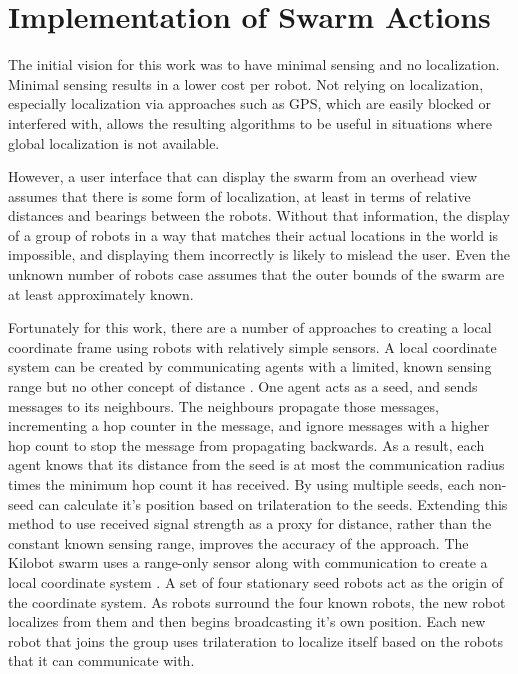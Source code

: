 \section{Implementation of Swarm Actions} \label{section:Implementation_of_Swarm_Actions}

The initial vision for this work was to have minimal sensing and no localization. 
Minimal sensing results in a lower cost per robot. 
Not relying on localization, especially localization via approaches such as GPS, which are easily blocked or interfered with, allows the resulting algorithms to be useful in situations where global localization is not available. 

However, a user interface that can display the swarm from an overhead view assumes that there is some form of localization, at least in terms of relative distances and bearings between the robots.
Without that information, the display of a group of robots in a way that matches their actual locations in the world is impossible, and displaying them incorrectly is likely to mislead the user. 
Even the unknown number of robots case assumes that the outer bounds of the swarm are at least approximately known. 

Fortunately for this work, there are a number of approaches to creating a local coordinate frame using robots with relatively simple sensors. 
A local coordinate system can be created by communicating agents with a limited, known sensing range but no other concept of distance \citep{bachrach2004experimental}.
One agent acts as a seed, and sends messages to its neighbours.
The neighbours propagate those messages, incrementing a hop counter in the message, and ignore messages with a higher hop count to stop the message from propagating backwards. 
As a result, each agent knows that its distance from the seed is at most the communication radius times the minimum hop count it has received. 
By using multiple seeds, each non-seed can calculate it's position based on trilateration to the seeds. 
Extending this method to use received signal strength as a proxy for distance, rather than the constant known sensing range, improves the accuracy of the approach.  
The Kilobot swarm uses a range-only sensor along with communication to create a local coordinate system \citep{Rubenstein795}.
A set of four stationary seed robots act as the origin of the coordinate system. As robots surround the four known robots, the new robot localizes from them and then begins broadcasting it's own position. 
Each new robot that joins the group uses trilateration to localize itself based on the robots that it can communicate with.

